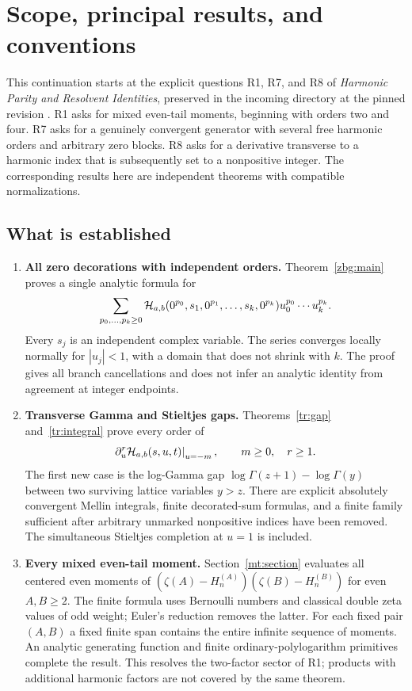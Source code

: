 \section{Scope, principal results, and conventions}
\label{scope:section}

This continuation starts at the explicit questions R1, R7, and R8 of
\emph{Harmonic Parity and Resolvent Identities}, preserved in the incoming
directory at the pinned revision \cite{IncomingParity,Repository}.
R1 asks for mixed even-tail moments, beginning with orders two and four.
R7 asks for a genuinely convergent generator with several free harmonic
orders and arbitrary zero blocks. R8 asks for a derivative transverse to
a harmonic index that is subsequently set to a nonpositive integer.
The corresponding results here are independent theorems with compatible
normalizations.

\subsection{What is established}

\begin{enumerate}[leftmargin=*,label=\textbf{\arabic*.}]
\item \textbf{All zero decorations with independent orders.}
Theorem~\ref{zbg:main} proves a single analytic formula for
\[
 \sum_{p_0,\ldots,p_k\geq0}
 \mathcal H_{a,b}(0^{p_0},s_1,0^{p_1},\ldots,s_k,0^{p_k})
                     u_0^{p_0}\cdots u_k^{p_k}.
\]
Every $s_j$ is an independent complex variable. The series converges
locally normally for $|u_j|<1$, with a domain that does not shrink with
$k$. The proof gives all branch cancellations and does not infer an
analytic identity from agreement at integer endpoints.

\item \textbf{Transverse Gamma and Stieltjes gaps.}
Theorems~\ref{tr:gap} and~\ref{tr:integral} prove every order of
\[
 \left.\partial_u^r\mathcal H_{a,b}(s,u,t)\right|_{u=-m},
 \qquad m\geq0,\quad r\geq1.
\]
The first new case is the log-Gamma gap
$\log\Gamma(z+1)-\log\Gamma(y)$ between two surviving lattice variables
$y>z$. There are explicit absolutely convergent Mellin integrals, finite
decorated-sum formulas, and a finite family sufficient after arbitrary
unmarked nonpositive indices have been removed. The simultaneous
Stieltjes completion at $u=1$ is included.

\item \textbf{Every mixed even-tail moment.}
Section~\ref{mt:section} evaluates all centered even moments of
$(\zeta(A)-H_n^{(A)})(\zeta(B)-H_n^{(B)})$ for even $A,B\geq2$.
The finite formula uses Bernoulli numbers and classical double zeta
values of odd weight; Euler's reduction removes the latter.
For each fixed pair $(A,B)$ a fixed finite span contains the entire
infinite sequence of moments. An analytic generating function and
finite ordinary-polylogarithm primitives complete the result.
This resolves the two-factor sector of R1; products with additional
harmonic factors are not covered by the same theorem.
\end{enumerate}


